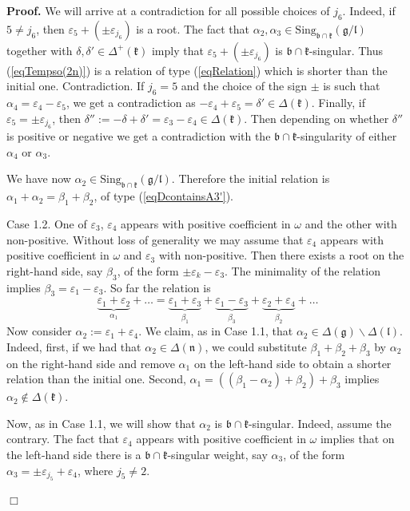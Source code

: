 \documentclass[12pt]{report}
\newenvironment{proof}[1][]{ \textbf{Proof#1. }}{$\Box$\medskip}
\newcommand{\kk}{\mathfrak{k}}
\newcommand{\nn}{\mathfrak{n}}
\newcommand{\gG}{\mathfrak{g}}
\newcommand{\bb}{\mathfrak{b}}
\newcommand{\lL}{\mathfrak{l}}
\newcommand{\refeq}[1]{(\ref{#1})}
\newcommand{\hw}{\mathrm{Sing}}
\newcommand{\eps}{\varepsilon}
\newcommand{\pmf}[1]{ \pm}%
\begin{document}
\begin{proof}
We will arrive at a contradiction for all possible choices of $j_6$. Indeed, if $5\neq j_6$, then $\eps_{5}+(\pmf{j_6}\eps_{j_6})$ is a root. The fact that  $\alpha_2,\alpha_3\in\hw_{\bb\cap\kk}(\gG/\lL)$ together with $\delta, \delta'\in \Delta^+(\kk)$ imply that $\eps_{5}+(\pmf{j_6}\eps_{j_6})$ is $\bb\cap\kk$-singular. Thus \refeq{eqTempso(2n)} is a relation of type (\ref{eqRelation}) which is shorter than the initial one. Contradiction. If $j_6=5$ and the choice of the sign $\pmf{j_6}$ is such that $\alpha_4=\eps_4-\eps_5 $, we get a contradiction as $-\eps_4+\eps_5= \delta' \in \Delta (\kk)$. Finally, if $\eps_{5}=\pmf{j_6}\eps_{j_6}$, then $\delta'':= -\delta+\delta'= \eps_{3}-\eps_{4}\in\Delta(\kk)$. Then depending on whether $\delta''$ is positive or negative we get a contradiction with the $\bb\cap\kk$-singularity of either $\alpha_4$ or $\alpha_3$.

We have now $\alpha_2\in\hw_{\bb\cap\kk}(\gG/\lL)$. Therefore the initial relation is $\alpha_1+\alpha_2=\beta_1+\beta_2$, of type \refeq{eqDcontainsA3'}.

\noindent Case 1.2. One of $\eps_{3}$, $\eps_{4}$ appears with positive coefficient in $\omega$ and the other with non-positive. Without loss of generality we may assume that $\eps_{4}$ appears with positive coefficient in $\omega$ and $\eps_3$ with non-positive. Then there exists a root on the right-hand side, say $\beta_3$, of the form $\pmf{k}\eps_{k}- \eps_{ 3}$. The minimality of the relation implies $\beta_3=\eps_{1} - \eps_{ 3}$. So far the relation is
\[
\underbrace{\eps_{1}+\eps_{2}}_{\alpha_1}+\dots=\underbrace{\eps_{1}+ \eps_{3}}_{\beta_1}+ \underbrace{\eps_{1}- \eps_{3}}_{\beta_3} + \underbrace{\eps_{2}+\eps_{4}}_{\beta_2}+\dots
\]
Now consider $\alpha_2:=\eps_{1}+\eps_{4}$. We claim, as in Case 1.1, that $\alpha_2\in\Delta(\gG)\backslash\Delta(\lL)$. Indeed, first, if we had that $\alpha_2\in\Delta(\nn)$, we could substitute $\beta_1+\beta_2+\beta_3$ by $\alpha_2$ on the right-hand side and remove $\alpha_1$ on the left-hand side to obtain a shorter relation than the initial one. Second, $\alpha_1=((\beta_1-\alpha_2)+\beta_2)+\beta_3$ implies $\alpha_2 \notin\Delta(\kk)$. 

Now, as in Case 1.1, we will show that $\alpha_2$ is $\bb\cap\kk$-singular. Indeed, assume the contrary. The fact that $\eps_{4}$ appears with positive coefficient in $\omega$ implies that on the left-hand side there is a $\bb\cap\kk$-singular weight, say $\alpha_3$, of the form $\alpha_3= \pmf{j_5}\eps_{j_5}+\eps_{ 4} $, where $j_5\neq 2$. 


\end{proof}
\end{document}
